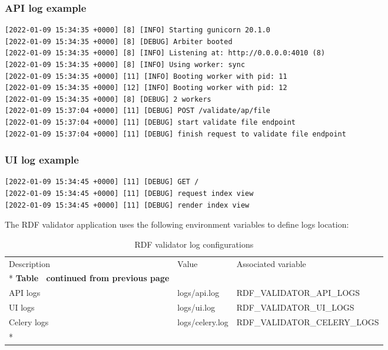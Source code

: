 \subsubsection{API log example}
\begin{lstlisting}
[2022-01-09 15:34:35 +0000] [8] [INFO] Starting gunicorn 20.1.0
[2022-01-09 15:34:35 +0000] [8] [DEBUG] Arbiter booted
[2022-01-09 15:34:35 +0000] [8] [INFO] Listening at: http://0.0.0.0:4010 (8)
[2022-01-09 15:34:35 +0000] [8] [INFO] Using worker: sync
[2022-01-09 15:34:35 +0000] [11] [INFO] Booting worker with pid: 11
[2022-01-09 15:34:35 +0000] [12] [INFO] Booting worker with pid: 12
[2022-01-09 15:34:35 +0000] [8] [DEBUG] 2 workers
[2022-01-09 15:37:04 +0000] [11] [DEBUG] POST /validate/ap/file
[2022-01-09 15:37:04 +0000] [11] [DEBUG] start validate file endpoint
[2022-01-09 15:37:04 +0000] [11] [DEBUG] finish request to validate file endpoint
\end{lstlisting}

\subsubsection{UI log example}
\begin{lstlisting}
[2022-01-09 15:34:45 +0000] [11] [DEBUG] GET /
[2022-01-09 15:34:45 +0000] [11] [DEBUG] request index view
[2022-01-09 15:34:45 +0000] [11] [DEBUG] render index view
\end{lstlisting}

The RDF validator application uses the following environment variables to define logs location:

\begin{longtable}[c]{@{}p{3.5cm}p{3.5cm}l@{}}
	\toprule
	Description & Value           & Associated variable          \\* \midrule
	\endfirsthead
	\multicolumn{3}{c}%
	{{\bfseries Table \thetable\ continued from previous page}}  \\
	\endhead
	\bottomrule
	\endfoot
	\endlastfoot
	API logs    & logs/api.log    & RDF\_VALIDATOR\_API\_LOGS    \\
	UI logs     & logs/ui.log     & RDF\_VALIDATOR\_UI\_LOGS     \\
	Celery logs & logs/celery.log & RDF\_VALIDATOR\_CELERY\_LOGS \\* \bottomrule
	\caption{RDF validator log configurations}
	\label{tab:rdf-validator-log}                                \\
\end{longtable}
